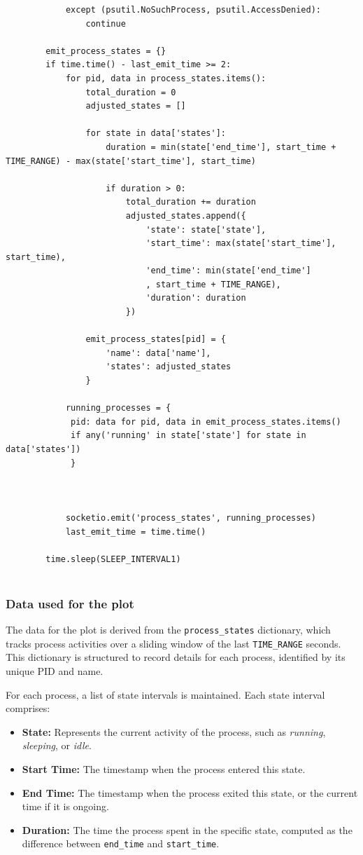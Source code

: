 \documentclass[12pt]{article}
\begin{document}
\begin{verbatim}
            except (psutil.NoSuchProcess, psutil.AccessDenied):
                continue

        emit_process_states = {}
        if time.time() - last_emit_time >= 2:
            for pid, data in process_states.items():
                total_duration = 0
                adjusted_states = []

                for state in data['states']:
                    duration = min(state['end_time'], start_time + TIME_RANGE) - max(state['start_time'], start_time)

                    if duration > 0:
                        total_duration += duration
                        adjusted_states.append({
                            'state': state['state'],
                            'start_time': max(state['start_time'], start_time),
                            'end_time': min(state['end_time']
                            , start_time + TIME_RANGE),
                            'duration': duration
                        })
                                
                emit_process_states[pid] = {
                    'name': data['name'],
                    'states': adjusted_states
                }

            running_processes = {
             pid: data for pid, data in emit_process_states.items()
             if any('running' in state['state'] for state in data['states'])
             }   


            
            socketio.emit('process_states', running_processes)  
            last_emit_time = time.time() 

        time.sleep(SLEEP_INTERVAL1)  


\end{verbatim}

\subsubsection{Data used for the plot}
The data for the plot is derived from the \texttt{process\_states} dictionary, which tracks process activities over a sliding window of the last \texttt{TIME\_RANGE} seconds. This dictionary is structured to record details for each process, identified by its unique PID and name. 

For each process, a list of state intervals is maintained. Each state interval comprises:
\begin{itemize}
    \item \textbf{State:} Represents the current activity of the process, such as \textit{running}, \textit{sleeping}, or \textit{idle}.
    \item \textbf{Start Time:} The timestamp when the process entered this state.
    \item \textbf{End Time:} The timestamp when the process exited this state, or the current time if it is ongoing.
    \item \textbf{Duration:} The time the process spent in the specific state, computed as the difference between \texttt{end\_time} and \texttt{start\_time}.
\end{itemize}
\end{document}
